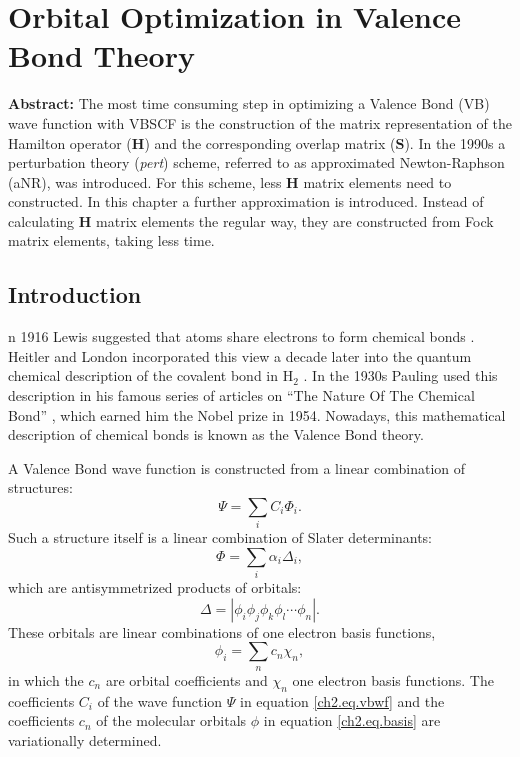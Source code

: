 \chapter{Orbital Optimization in Valence Bond Theory}
\label{chap_orbopt}


\noindent\textbf{Abstract:} The most time consuming step in optimizing a Valence Bond (VB) wave function with VBSCF is the construction of the matrix representation of the Hamilton operator ($\mathbf{H}$) and the corresponding overlap matrix ($\mathbf{S}$). In the 1990s a perturbation theory (\textit{pert}) scheme, referred to as approximated Newton-Raphson (aNR), was introduced. For this scheme, less $\mathbf{H}$ matrix elements need to constructed. In this chapter a further approximation is introduced. Instead of calculating $\mathbf{H}$ matrix elements the regular way, they are constructed from Fock matrix elements, taking less time.

\newpage

\section{Introduction}

\lettrine{}{}n 1916 Lewis suggested that atoms share electrons to form chemical bonds \cite{lewis}. Heitler and London incorporated this view a decade later into the quantum chemical description of the covalent bond in H$_2$ \cite{heitler}. In the 1930s Pauling used this description in his famous series of articles on ``The Nature Of The Chemical Bond'' \cite{pauling1,pauling2,pauling3,pauling4,pauling5,pauling6,pauling7,paulingbook}, which earned him the Nobel prize in 1954. Nowadays, this mathematical description of chemical bonds is known as the Valence Bond theory.

A Valence Bond wave function is constructed from a linear combination of structures:
\begin{equation}
\Psi = \sum_{i} C_i \Phi_i.
\label{ch2.eq.vbwf}
\end{equation}
Such a structure itself is a linear combination of Slater determinants:
\begin{equation}
\Phi = \sum_{i} \alpha_i \Delta_i,
\label{ch2.eq.struct}
\end{equation}
which are antisymmetrized products of orbitals:
\begin{equation}
\Delta = |\phi_i\phi_j\phi_k\phi_l \cdots \phi_n|.
\label{ch2.eq.determ}
\end{equation}
These orbitals are linear combinations of one electron basis functions,
\begin{equation}
\phi_i = \sum_{n} c_n \chi_n,
\label{ch2.eq.basis}
\end{equation}
in which the $c_n$ are orbital coefficients and $\chi_n$ one electron basis functions. The coefficients $C_i$ of the wave function $\Psi$ in equation \ref{ch2.eq.vbwf} and the coefficients $c_n$ of the molecular orbitals $\phi$ in equation \ref{ch2.eq.basis} are variationally determined. 

